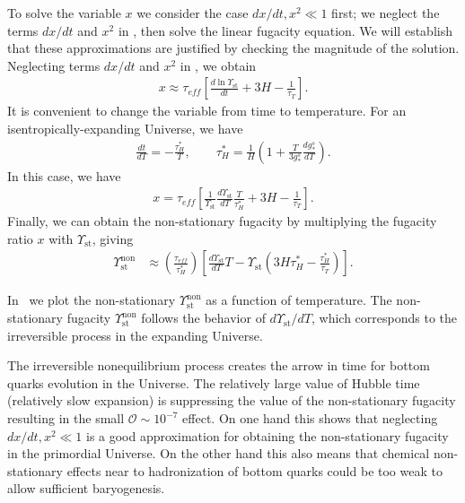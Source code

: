 To solve the variable $x$ we consider the case $dx/dt,x^2\ll1$ first; we neglect the terms $dx/dt$ and $x^2$ in , then solve the linear fugacity equation. We will establish that these approximations are justified by checking the magnitude of the solution. Neglecting terms $dx/dt$ and $x^2$ in , we obtain
\begin{align}
x\approx\tau_{eff}\left[\frac{d\ln\Upsilon_\mathrm{st}}{dt}+3H-\frac{1}{\tau_T}\right].
\end{align}
It is convenient to change the variable from time to temperature. For an isentropically-expanding Universe, we have
\begin{align}\label{tau_H}
\frac{dt}{dT}=-\frac{\tau^\ast_H}{T},\qquad \tau^\ast_H=\frac{1}{H}\left(1+\frac{T}{3g^s_\ast}\frac{dg^s_\ast}{dT}\right).
\end{align}
In this case, we have
\begin{align}
x=\tau_{eff}\left[\frac{1}{\Upsilon_\mathrm{st}}\frac{d\Upsilon_\mathrm{st}}{dT}\frac{T}{\tau^\ast_H}+3H-\frac{1}{\tau_T}\right].
\end{align}
Finally, we can obtain the non-stationary fugacity by multiplying the fugacity ratio $x$ with $\Upsilon_\mathrm{st}$, giving 
\begin{align}
\Upsilon_{\mathrm{st}}^{\mathrm{non}}
&\approx\left(\frac{\tau_{eff}}{\tau^\ast_H}\right)\left[\frac{d\Upsilon_\mathrm{st}}{dT}T-\Upsilon_{\mathrm{st}}\left(3H\tau^\ast_H-\frac{\tau^\ast_H}{\tau_T}\right)\right].
\end{align}

In~ we plot the non-stationary $\Upsilon^{\mathrm{non}}_\mathrm{st}$ as a function of temperature. The non-stationary fugacity $\Upsilon^{\mathrm{non}}_\mathrm{st}$ follows the behavior of $d\Upsilon_{\mathrm{st}}/dT$, which corresponds to the irreversible process in the expanding Universe. 

The irreversible nonequilibrium process creates the arrow in time for bottom quarks evolution in the Universe. The relatively large value of Hubble time (relatively slow expansion) is suppressing the value of the non-stationary fugacity resulting in the small $\mathcal{O}\sim10^{-7}$ effect. On one hand this shows that  neglecting $dx/dt,x^2\ll1$ is a good approximation for obtaining the non-stationary fugacity in the primordial Universe. On the other hand this also means that chemical non-stationary effects near to hadronization of bottom quarks could be too weak to allow sufficient baryogenesis.


